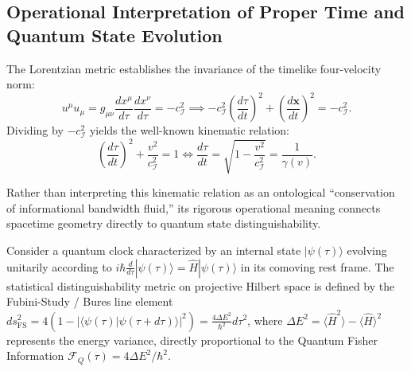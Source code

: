 \documentclass[11pt,a4paper]{article}
\begin{document}
\subsection{Operational Interpretation of Proper Time and Quantum State Evolution}

The Lorentzian metric establishes the invariance of the timelike four-velocity norm:
\begin{equation}
u^\mu u_\mu = g_{\mu\nu} \frac{dx^\mu}{d\tau} \frac{dx^\nu}{d\tau} = -c_{\mathcal{I}}^2 \implies -c_{\mathcal{I}}^2 \left(\frac{d\tau}{dt}\right)^2 + \left(\frac{d\mathbf{x}}{dt}\right)^2 = -c_{\mathcal{I}}^2.
\end{equation}
Dividing by $-c_{\mathcal{I}}^2$ yields the well-known kinematic relation:
\begin{equation}
\left(\frac{d\tau}{dt}\right)^2 + \frac{v^2}{c_{\mathcal{I}}^2} = 1 \iff \frac{d\tau}{dt} = \sqrt{1 - \frac{v^2}{c_{\mathcal{I}}^2}} = \frac{1}{\gamma(v)}.
\end{equation}

Rather than interpreting this kinematic relation as an ontological ``conservation of informational bandwidth fluid,'' its rigorous operational meaning connects spacetime geometry directly to quantum state distinguishability.

Consider a quantum clock characterized by an internal state $|\psi(\tau)\rangle$ evolving unitarily according to $i\hbar \frac{d}{d\tau}|\psi(\tau)\rangle = \hat{H}|\psi(\tau)\rangle$ in its comoving rest frame. The statistical distinguishability metric on projective Hilbert space is defined by the Fubini-Study / Bures line element $ds_{\text{FS}}^2 = 4(1 - |\langle \psi(\tau)|\psi(\tau + d\tau)\rangle|^2) = \frac{4\Delta E^2}{\hbar^2} d\tau^2$, where $\Delta E^2 = \langle \hat{H}^2 \rangle - \langle \hat{H} \rangle^2$ represents the energy variance, directly proportional to the Quantum Fisher Information $\mathcal{F}_Q(\tau) = 4\Delta E^2 / \hbar^2$.
\end{document}

